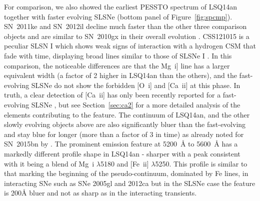 \documentclass[useAMS,usenatbib]{mn2e}
\begin{document}
For comparison, we also showed the earliest PESSTO spectrum of LSQ14an together with 
faster evolving SLSNe (bottom panel of Figure~\ref{fig:spcmp}). 
SN~2011ke and SN~2012il decline much faster than the other three comparison objects and are similar to 
SN~2010gx in their overall evolution \citep[see][for a discussion of these two objects]{in13}.  CSS121015 is a peculiar SLSN I which 
shows weak signs of interaction with a hydrogen CSM that fade with time, displaying broad lines similar to those of SLSNe I  \citep{ben14}. In this comparison, the 
noticeable differences are that the Mg~{\sc i}] line has a larger equivalent width 
(a factor of 2 higher in LSQ14an than the others), and the fast-evolving SLSNe do not show 
the forbidden [O~{\sc i}] and [Ca~{\sc ii}] at this phase. In truth, a clear detection of [Ca~{\sc ii}] has only been recently reported for a fast-evolving SLSNe \citep[at +151d from maximum in Gaia16apd,][a SLSNe that shows a late photometric behaviour intermediate between the fast- and slow-evolving events]{kan16}, but see Section~\ref{sec:ca2} for a more detailed analysis of the elements contributing to the feature. The continuum of 
LSQ14an, and the other slowly evolving objects above are also significantly bluer than the fast-evolving and stay blue for longer (more than a factor of 3 in time) as already noted for SN~2015bn by \citep{ni16a}. The prominent emission feature at  5200~\AA\/ to 5600~\AA\/ has a 
markedly different profile shape in LSQ14an - sharper with a peak consistent with it being a 
blend of Mg~{\sc i} $\lambda$5180 and [Fe~{\sc ii}] $\lambda$5250. This profile is similar to that marking the beginning of the pseudo-continuum, dominated by Fe lines, in interacting SNe such as SNe 2005gl and 2012ca \citep{gy07,in16a} but in the SLSNe case the feature is 200\AA\/ bluer and not as sharp as in the interacting transients.
\end{document}

